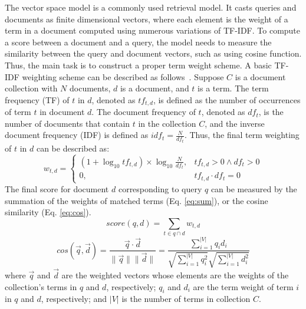 The vector space model is a commonly used retrieval model.
It casts queries and documents as finite dimensional vectors, where each element is the weight of a term in a document computed using numerous variations of TF-IDF. To compute a score between a document and a query, the model needs to measure the similarity between the query and document vectors, such as using cosine function. Thus, the main task is to construct a proper term weight scheme.
A basic TF-IDF weighting scheme can be described as follows~\cite{MRS08}.
Suppose $C$ is a document collection with $N$ documents, $d$ is a document, and $t$ is a term.
The term frequency (TF) of $t$ in $d$, denoted as $tf_{t,d}$, is defined as the number of occurrences of term $t$ in document $d$.
The document frequency of $t$, denoted as $df_t$, is the number of documents that contain $t$ in the collection $C$, and the inverse document frequency (IDF) is defined as $idf_t=\frac{N}{df_t}$.
Thus, the final term weighting of $t$ in $d$ can be described as:
\begin{equation}
	  w_{t,d}=\left\{
  \begin{array}{ll}
    (1+\log_{10}tf_{t,d})\times \log_{10}\frac{N}{df_t}, & tf_{t,d}>0 \wedge df_{t}>0\\
    0, & tf_{t,d}\cdot df_{t}=0
  \end{array}\right.
\end{equation}
The final score for document $d$ corresponding to query $q$ can be measured by the summation of the weights of matched terms (Eq. \ref{eq:sum}),  or the cosine similarity (Eq. \ref{eq:cos}).
\begin{equation}\label{eq:sum}
  score(q,d)=\sum_{t\in q\cap d}w_{t,d}
\end{equation}
\begin{equation}\label{eq:cos}
  cos(\vec{q},\vec{d})=\frac{\vec{q}\cdot \vec{d}}{\|\vec{q}\|\|\vec{d}\|}=\frac{\sum_{i=1}^{|V|} q_id_i}{\sqrt{\sum_{i=1}^{|V|} q_i^2}\sqrt{\sum_{i=1}^{|V|} d_i^2}}
\end{equation}
where $\vec{q}$ and $\vec{d}$ are the weighted vectors whose elements are the weights of the collection's terms in $q$ and $d$, respectively; $q_i$ and $d_i$ are the term weight of term $i$ in $q$ and $d$, respectively; and $|V|$ is the number of terms in collection $C$.




